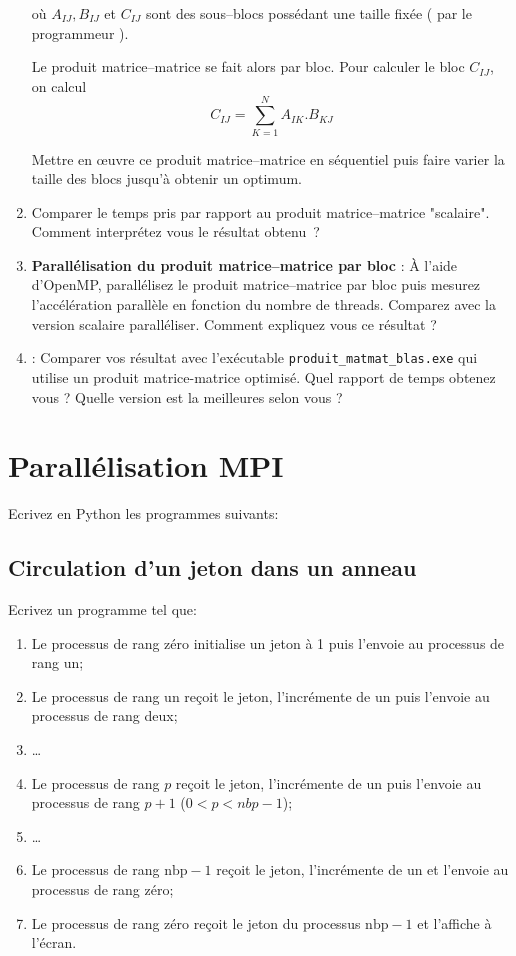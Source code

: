 \documentclass[11pt,a4paper]{article}
\begin{document}
\begin{enumerate}
où $A_{IJ},B_{IJ}$ et $C_{IJ}$ sont des sous--blocs possédant une taille fixée ( par le programmeur ).

Le produit matrice--matrice se fait alors par bloc. Pour calculer le bloc $C_{IJ}$, on calcul
\[
C_{IJ} = \sum_{K=1}^{N}A_{IK}.B_{KJ}
\]

Mettre en {\oe}uvre ce produit matrice--matrice en séquentiel puis faire varier la taille des blocs jusqu'à obtenir un optimum.
\item Comparer le temps pris par rapport au produit matrice--matrice "scalaire". Comment interprétez vous le résultat obtenu~?

\item \textbf{\color{blue}Parallélisation du produit matrice--matrice par bloc }: \`A l'aide d'OpenMP, parallélisez le produit matrice--matrice par bloc puis mesurez l'accélération parallèle en fonction du nombre de threads. Comparez avec la version scalaire paralléliser. Comment expliquez vous ce résultat ?
\item \textbf{\color{blue}{Comparaison avec blas}}: Comparer vos résultat avec l'exécutable \texttt{produit\_matmat\_blas.exe} qui utilise un produit matrice-matrice 
                                                     optimisé. Quel rapport de temps obtenez vous ? Quelle version est la meilleures selon vous ?
\end{enumerate}

\section{Parallélisation MPI}

Ecrivez en Python les programmes suivants:

\subsection{Circulation d'un jeton dans un anneau}

Ecrivez un programme tel que:
\begin{enumerate}
	\item Le processus de rang zéro initialise un jeton à 1 puis l'envoie au processus de rang un;
	\item Le processus de rang un reçoit le jeton, l'incrémente de un puis l'envoie au processus de rang deux;
	\item \ldots
	\item Le processus de rang $p$ reçoit le jeton, l'incrémente de un puis l'envoie au processus de rang $p+1$ ($0<p<nbp-1$);
	\item \ldots
	\item Le processus de rang $\mbox{nbp}-1$ reçoit le jeton, l'incrémente de un et l'envoie au processus de rang zéro;
	\item Le processus de rang zéro reçoit le jeton du processus $\mbox{nbp}-1$ et l'affiche à l'écran.
\end{enumerate}
\end{document}
